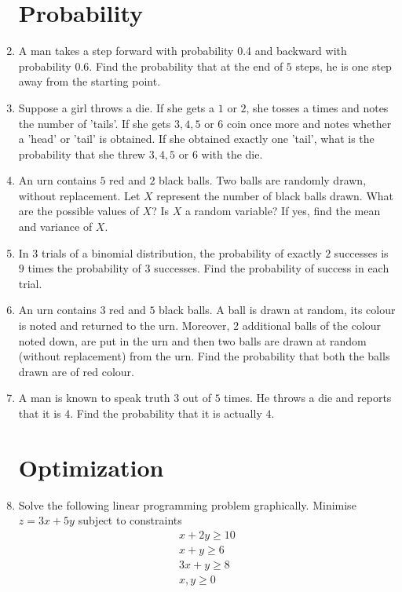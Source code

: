 \documentclass[12pt,-letter paper]{article}
\begin{document}
\begin{enumerate}
\section{Probability}
	\item A man takes a step forward with probability 0.4 and backward with probability $0.6$. Find the probability that at the end of $5$ steps, he is one step away from the starting point.


	\item Suppose a girl throws a die. If she gets a $1$ or $2$, she tosses a times and notes the number of 'tails'. If she gets $3, 4, 5$ or $6$ coin once more and notes whether a 'head' or 'tail' is obtained. If she obtained exactly one 'tail', what is the probability that she threw $3, 4, 5$ or $6$ with the die.


	\item An urn contains $5$ red and $2$ black balls. Two balls are randomly drawn, without replacement. Let $X$ represent the number of black balls drawn. What are the possible values of $X$? Is $X$ a random variable? If yes, find the mean and variance of $X$.

	\item In $3$ trials of a binomial distribution, the probability of exactly $2$ successes is $9$ times the probability of $3$ successes. Find the probability of success in each trial.

	\item An urn contains $3$ red and $5$ black balls. A ball is drawn at random, its colour is noted and returned to the urn. Moreover, $2$ additional balls of the colour noted down, are put in the urn and then two balls are drawn at random (without replacement) from the urn. Find the probability that both the balls drawn are of red colour.
     \item A man is known to speak truth $3$ out of $5$ times. He throws a die and reports that it is $4$. Find the probability that it is actually $4$.

\section{Optimization}
	\item Solve the following linear programming problem graphically. Minimise $z = 3x+5y$ subject to constraints
     \begin{align*}
         x+2y\ge 10\\
         x+y\ge 6\\
         3x+y\ge8\\
         x,y\ge0
     \end{align*}
 

\end{enumerate}
\end{document}
